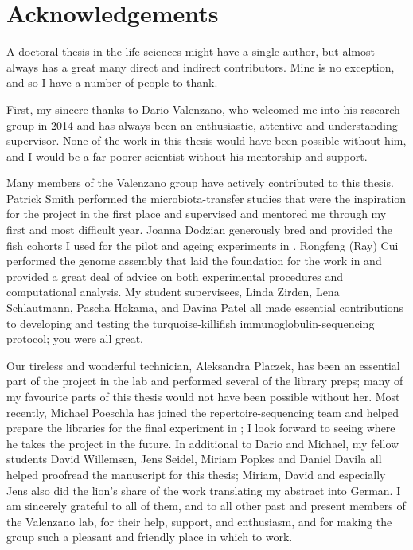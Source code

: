 {
\cleardoublepage
\setsinglecolumn
\chapter*{\centering \LARGE Acknowledgements}
\thispagestyle{empty}

A doctoral thesis in the life sciences might have a single author, but almost always has a great many direct and indirect contributors. Mine is no exception, and so I have a number of people to thank.

First, my sincere thanks to Dario Valenzano, who welcomed me into his research group in 2014 and has always been an enthusiastic, attentive and understanding supervisor. None of the work in this thesis would have been possible without him, and I would be a far poorer scientist without his mentorship and support.

Many members of the Valenzano group have actively contributed to this thesis. Patrick Smith performed the microbiota-transfer studies that were the inspiration for the project in the first place and supervised and mentored me through my first and most difficult year. Joanna Dodzian generously bred and provided the fish cohorts I used for the pilot and ageing experiments in . Rongfeng (Ray) Cui performed the genome assembly that laid the foundation for the work in  and provided a great deal of advice on both experimental procedures and computational analysis. My student supervisees, Linda Zirden, Lena Schlautmann, Pascha Hokama, and Davina Patel all made essential contributions to developing and testing the turquoise-killifish immunoglobulin-sequencing protocol; you were all great. 

Our tireless and wonderful technician, Aleksandra Placzek, has been an essential part of the \igseq project in the lab and performed several of the library preps; many of my favourite parts of this thesis would not have been possible without her. Most recently, Michael Poeschla has joined the repertoire-sequencing team and helped prepare the libraries for the final \igseq experiment in ; I look forward to seeing where he takes the project in the future. In additional to Dario and Michael, my fellow students David Willemsen, Jens Seidel, Miriam Popkes and Daniel Davila all helped proofread the manuscript for this thesis; Miriam, David and especially Jens also did the lion's share of the work translating my abstract into German. I am sincerely grateful to all of them, and to all other past and present members of the Valenzano lab, for their help, support, and enthusiasm, and for making the group such a pleasant and friendly place in which to work.

}
